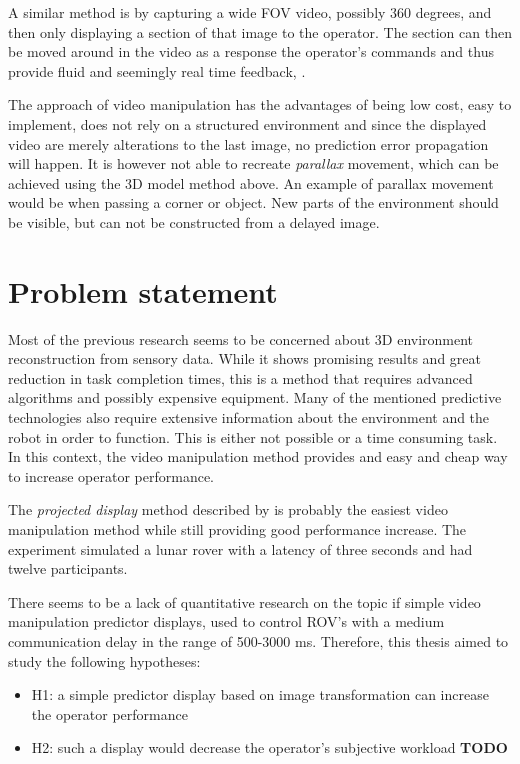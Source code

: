 A similar method is by capturing a wide FOV video, possibly 360 degrees, and then only displaying a section of that image to the operator. The section can then be moved around in the video as a response the operator's commands and thus provide fluid and seemingly real time feedback, \citep{Baldwin1999}.

The approach of video manipulation has the advantages of being low cost, easy to implement, does not rely on a structured environment and since the displayed video are merely alterations to the last image, no prediction error propagation will happen. It is however not able to recreate \textit{parallax} movement, which can be achieved using the 3D model method above. An example of parallax movement would be when passing a corner or object. New parts of the environment should be visible, but can not be constructed from a delayed image.

\section{Problem statement}

Most of the previous research seems to be concerned about 3D environment reconstruction from sensory data. While it shows promising results and great reduction in task completion times, this is a method that requires advanced algorithms and possibly expensive equipment. Many of the mentioned predictive technologies also require extensive information about the environment and the robot in order to function. This is either not possible or a time consuming task. In this context, the video manipulation method provides and easy and cheap way to increase operator performance.

The \textit{projected display} method described by \citep{Matheson2013} is probably the easiest video manipulation method while still providing good performance increase. The experiment simulated a lunar rover with a latency of three seconds and had twelve participants.

There seems to be a lack of quantitative research on the topic if simple video manipulation predictor displays, used to control ROV's with a medium communication delay in the range of 500-3000 ms. Therefore, this thesis aimed to study the following hypotheses:

\begin{itemize}
\item H1: a simple predictor display based on image transformation can 
 increase the operator performance
 \item H2: such a display would decrease the operator's subjective workload \textbf{TODO}
\end{itemize}

